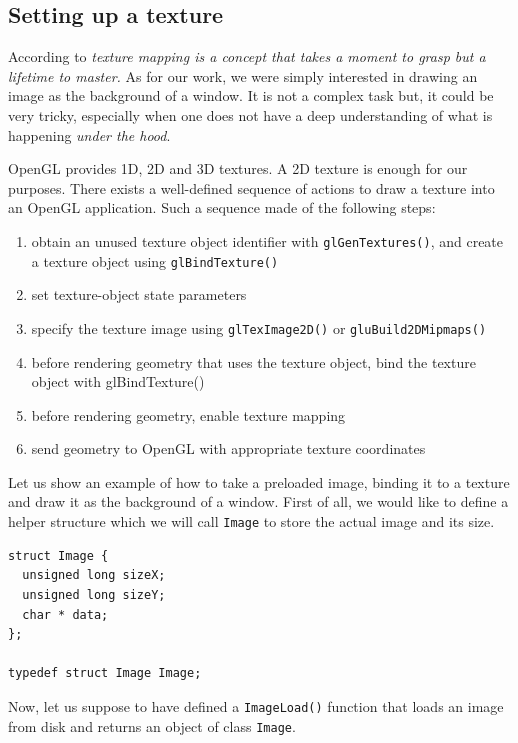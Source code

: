 

%
\subsection{Setting up a texture}
According to \cite{opengl:distilled} \textit{texture mapping 
is a concept that takes a moment to grasp but a lifetime 
to master.}
%
As for our work, we were simply interested in drawing an 
image as the background of a window. It is not a complex 
task but, it could be very tricky, especially when one 
does not have a deep understanding of what is happening 
\textit{under the hood}.
%

%
OpenGL provides 1D, 2D and 3D textures. A 2D texture is enough for our
purposes.
%
There exists a well-defined sequence of actions to draw a texture 
into an OpenGL application. Such a sequence made of the following steps:
\begin{enumerate}
\item obtain an unused texture object identifier with \texttt{glGenTextures()}, 
  and create a texture object using \texttt{glBindTexture()}
\item set texture-object state parameters
\item specify the texture image using \texttt{glTexImage2D()} 
  or \texttt{gluBuild2DMipmaps()}
\item before rendering geometry that uses the texture object, 
  bind the texture object with glBindTexture()
\item before rendering geometry, enable texture mapping
\item send geometry to OpenGL with appropriate texture 
  coordinates
\end{enumerate}
%
Let us show an example of how to take a preloaded image, binding it 
to a texture and draw it as the background of a window. First of all, 
we would like to define a helper structure which we will call \texttt{Image}
to store the actual image and its size.
%
\begin{lstlisting}[caption={The Image structure}, label={code:image}, frame=trBL]
struct Image {
  unsigned long sizeX;
  unsigned long sizeY;
  char * data;
};

typedef struct Image Image;
\end{lstlisting}
%
Now, let us suppose to have defined a \texttt{ImageLoad()} function 
that loads an image from disk and returns an object of class \texttt{Image}. 
